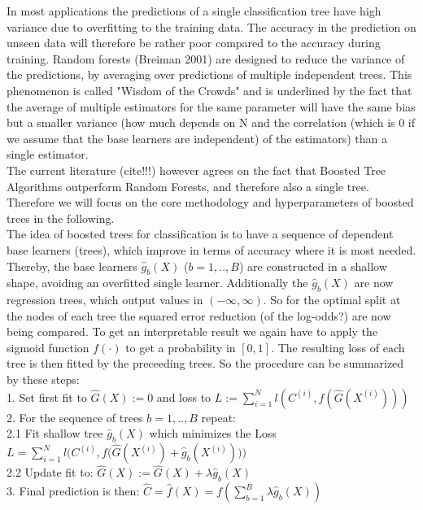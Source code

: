 \documentclass[12pt,titlepage]{article}
\begin{document}
In most applications the predictions of a single classification tree have high variance due to overfitting to the training data. The accuracy in the prediction on unseen data will therefore be rather poor compared to the accuracy during training. Random forests (Breiman 2001) are designed to reduce the variance of the predictions, by averaging over predictions of multiple independent trees. This phenomenon is called "Wisdom of the Crowds" and is underlined by the fact that the average of multiple estimators for the same parameter will have the same bias but a smaller variance (how much depends on N and the correlation (which is 0 if we assume that the base learners are independent) of the estimators) than a single estimator. \\
The current literature (cite!!!) however agrees on the fact that Boosted Tree Algorithms outperform Random Forests, and therefore also a single tree. Therefore we will focus on the core methodology and hyperparameters of boosted trees in the following. \\
The idea of boosted trees for classification is to have a sequence of dependent base learners (trees), which improve in terms of accuracy where it is most needed. Thereby, the base learners $\hat{g}_{b}(X)$ ($b=1,..,B$) are constructed in a shallow shape, avoiding an overfitted single learner. Additionally the $\hat{g}_{b}(X)$ are now regression trees, which output values in $(-\infty, \infty)$. So for the optimal split at the nodes of each tree the squared error reduction (of the log-odds?) are now being compared. To get an interpretable result we again have to apply the sigmoid function $f(\cdot)$ to get a probability in $[0, 1]$. The resulting loss of each tree is then fitted by the preceeding trees. So the procedure can be summarized by these steps: \\
1. Set first fit to $\hat{G}(X) := 0$ and loss to $L := \sum_{i=1}^{N} l(C^{(i)}, f(\hat{G}(X^{(i)})))$ \\
2. For the sequence of trees $b=1,..,B$ repeat: \\
2.1 Fit shallow tree $\hat{g}_{b}(X)$ which minimizes the Loss $L = \sum_{i=1}^{N} l\Big(C^{(i)}, f\big(\hat{G}(X^{(i)}) + \hat{g}_{b}(X^{(i)})\big)\Big)$ \\
2.2 Update fit to: $\hat{G}(X) := \hat{G}(X) + \lambda\hat{g}_{b}(X)$\\
3. Final prediction is then: $\hat{C} = \hat{f}(X) = f(\sum_{b=1}^{B}\lambda\hat{g}_{b}(X))$ \\
\end{document}
